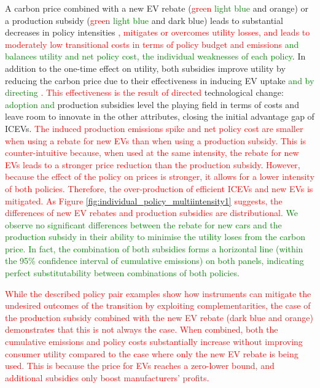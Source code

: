 \documentclass[12pt]{article}
\begin{document}
    A carbon price combined with a new EV rebate (\textcolor{red}{green} \textcolor{green}{light blue} and orange) or a production subsidy (\textcolor{red}{green} \textcolor{green}{light blue} and dark blue) leads to substantial decreases in policy intensities \textcolor{red}{, mitigates or overcomes utility losses, and leads to moderately low transitional costs in terms of policy budget and emissions} \textcolor{green}{and balances utility and net policy cost, the individual weaknesses of each policy}. In addition to the one-time effect on utility, both subsidies improve utility by reducing the carbon price due to their effectiveness in inducing EV uptake \textcolor{green}{and by directing } \textcolor{red}{. This effectiveness is the result of directed }technological change: \textcolor{green}{adoption and} production subsidies level the playing field in terms of costs and leave room to innovate in the other attributes, closing the initial advantage gap of ICEVs. \textcolor{red}{The induced production emissions spike and net policy cost are smaller when using a rebate for new EVs than when using a production subsidy. This is counter-intuitive because, when used at the same intensity, the rebate for new EVs leads to a stronger price reduction than the production subsidy. However, because the effect of the policy on prices is stronger, it allows for a lower intensity of both policies. Therefore, the over-production of efficient ICEVs and new EVs is mitigated. As Figure \ref{fig:individual_policy_multiintensity1} suggests, the differences of new EV rebates and production subsidies are distributional.} \textcolor{green}{We observe no significant differences between the rebate for new cars and the production subsidy in their ability to minimise the utility loses from the carbon price. In fact, the combination of both subsidies forms a horizontal line (within the 95\% confidence interval of cumulative emissions) on both panels, indicating perfect substitutability between combinations of both policies.}
			
	\textcolor{red}{While the described policy pair examples show how instruments can mitigate the undesired outcomes of the transition by exploiting complementarities, the case of the production subsidy combined with the new EV rebate (dark blue and orange) demonstrates that this is not always the case. When combined, both the cumulative emissions and policy costs substantially increase without improving consumer utility compared to the case where only the new EV rebate is being used. This is because the price for EVs reaches a zero-lower bound, and additional subsidies only boost manufacturers' profits.}
\end{document}

